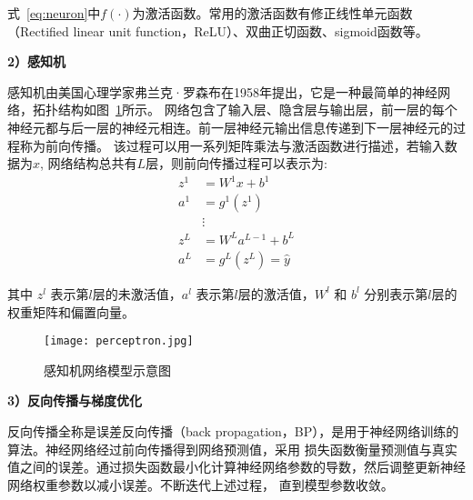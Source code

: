 式~\ref{eq:neuron}中$f(\cdot)$为激活函数。常用的激活函数有修正线性单元函数（Rectified linear unit function，ReLU）、双曲正切函数、sigmoid函数等。

\textbf{2）感知机}

感知机由美国心理学家弗兰克·罗森布\cite{1958perceptron}在1958年提出，它是一种最简单的神经网络，拓扑结构如图~\ref{fig:perceptron}所示。
网络包含了输入层、隐含层与输出层，前一层的每个神经元都与后一层的神经元相连。前一层神经元输出信息传递到下一层神经元的过程称为前向传播。
该过程可以用一系列矩阵乘法与激活函数进行描述，若输入数据为$x$, 网络结构总共有$L$层，则前向传播过程可以表示为:
\begin{equation}
  \begin{aligned}
  z^{1} & =W^{1} x+b^{1} \\
  a^{1} & =g^{1}\left(z^{1}\right) \\
  & \vdots \\
  z^{L} & =W^{L} a^{L-1}+b^{L} \\
  a^{L} & =g^{L}\left(z^{L}\right)=\hat{y}
  \label{eq:perceptron}
\end{aligned}
\end{equation}

其中 $z^{l}$ 表示第$l$层的未激活值，$a^{l}$ 表示第$l$层的激活值，$W^{l}$ 和 $b^{l}$ 分别表示第$l$层的权重矩阵和偏置向量。
\begin{figure}[htbp]
  \centering
  \texttt{[image: perceptron.jpg]}
  \caption{感知机网络模型示意图}
  \label{fig:perceptron}
\end{figure}

\textbf{3）反向传播与梯度优化}

反向传播全称是误差反向传播（back propagation，BP），是用于神经网络训练的算法。神经网络经过前向传播得到网络预测值，采用
损失函数衡量预测值与真实值之间的误差。通过损失函数最小化计算神经网络参数的导数，然后调整更新神经网络权重参数以减小误差。不断迭代上述过程，
直到模型参数收敛。

